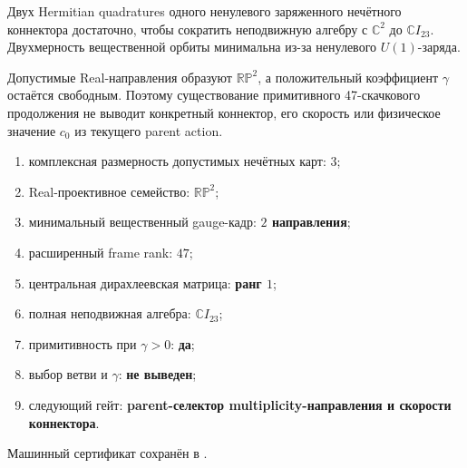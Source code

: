 \begin{theorem}
Двух Hermitian quadratures одного ненулевого заряженного нечётного
коннектора достаточно, чтобы сократить неподвижную алгебру с
$\mathbb C^2$ до $\mathbb C I_{23}$. Двухмерность вещественной орбиты
минимальна из-за ненулевого $U(1)$-заряда.
\end{theorem}

\begin{nogocriterion}
Допустимые Real-направления образуют $\mathbb{RP}^2$, а положительный
коэффициент $\gamma$ остаётся свободным. Поэтому существование примитивного
47-скачкового продолжения не выводит конкретный коннектор, его скорость или
физическое значение $c_0$ из текущего parent action.
\end{nogocriterion}

\begin{protocol}\begin{enumerate}
\item комплексная размерность допустимых нечётных карт: \textbf{$3$};
\item Real-проективное семейство: \textbf{$\mathbb{RP}^2$};
\item минимальный вещественный gauge-кадр: \textbf{$2$ направления};
\item расширенный frame rank: \textbf{$47$};
\item центральная дирахлеевская матрица: \textbf{ранг $1$};
\item полная неподвижная алгебра: \textbf{$\mathbb C I_{23}$};
\item примитивность при $\gamma>0$: \textbf{да};
\item выбор ветви и $\gamma$: \textbf{не выведен};
\item следующий гейт: \textbf{parent-селектор multiplicity-направления и
скорости коннектора}.
\end{enumerate}\end{protocol}

Машинный сертификат сохранён в
.